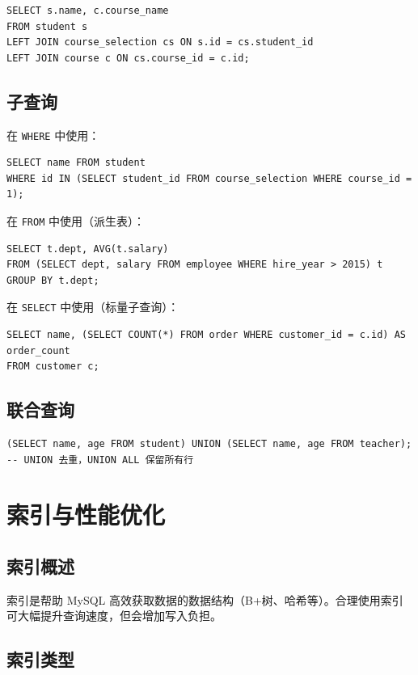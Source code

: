 \documentclass[12pt,UTF8]{ctexbook}
\begin{document}
\begin{lstlisting}
SELECT s.name, c.course_name
FROM student s
LEFT JOIN course_selection cs ON s.id = cs.student_id
LEFT JOIN course c ON cs.course_id = c.id;
\end{lstlisting}

\section{子查询}

在 \texttt{WHERE} 中使用：

\begin{lstlisting}
SELECT name FROM student
WHERE id IN (SELECT student_id FROM course_selection WHERE course_id = 1);
\end{lstlisting}

在 \texttt{FROM} 中使用（派生表）：

\begin{lstlisting}
SELECT t.dept, AVG(t.salary)
FROM (SELECT dept, salary FROM employee WHERE hire_year > 2015) t
GROUP BY t.dept;
\end{lstlisting}

在 \texttt{SELECT} 中使用（标量子查询）：

\begin{lstlisting}
SELECT name, (SELECT COUNT(*) FROM order WHERE customer_id = c.id) AS order_count
FROM customer c;
\end{lstlisting}

\section{联合查询}

\begin{lstlisting}
(SELECT name, age FROM student) UNION (SELECT name, age FROM teacher);
-- UNION 去重，UNION ALL 保留所有行
\end{lstlisting}

\chapter{索引与性能优化}
\label{ch:index}

\section{索引概述}
索引是帮助 MySQL 高效获取数据的数据结构（B+树、哈希等）。合理使用索引可大幅提升查询速度，但会增加写入负担。

\section{索引类型}
\end{document}
